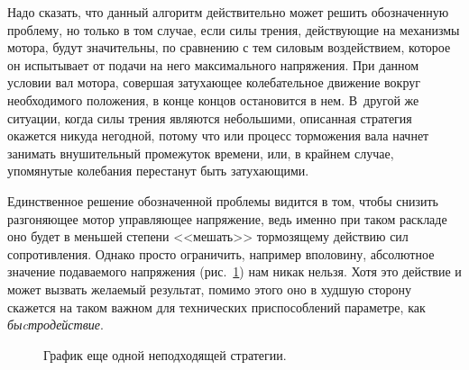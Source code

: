 \documentclass[12pt,a4paper,openany]{extarticle}
\begin{document}
Надо сказать, что данный алгоритм действительно может решить обозначенную проблему, но только в том случае, если силы трения, действующие на механизмы мотора, будут значительны, по сравнению с тем силовым воздействием, которое он испытывает от подачи на него максимального напряжения.
При данном условии вал мотора, совершая затухающее колебательное движение вокруг необходимого положения, в конце концов остановится в нем.
В~другой же ситуации, когда силы трения являются небольшими, описанная стратегия окажется никуда негодной, потому что или процесс торможения вала начнет занимать внушительный промежуток времени, или, в крайнем случае, упомянутые колебания перестанут быть затухающими.

Единственное решение обозначенной проблемы видится в том, чтобы снизить разгоняющее мотор управляющее напряжение, ведь именно при таком раскладе оно будет в меньшей степени <<мешать>> тормозящему действию сил сопротивления.
Однако просто ограничить, например вполовину, абсолютное значение подаваемого напряжения (рис.~\ref{3_graph}) нам никак нельзя. 
Хотя это действие и может вызвать желаемый результат, помимо этого оно в худшую сторону скажется на таком важном для технических приспособлений параметре, как \textit{быcтродействие}.

\begin{figure}[h]
	\noindent{}
	\caption{График еще одной неподходящей стратегии.}
	\label{3_graph}
\end{figure}
\end{document}
